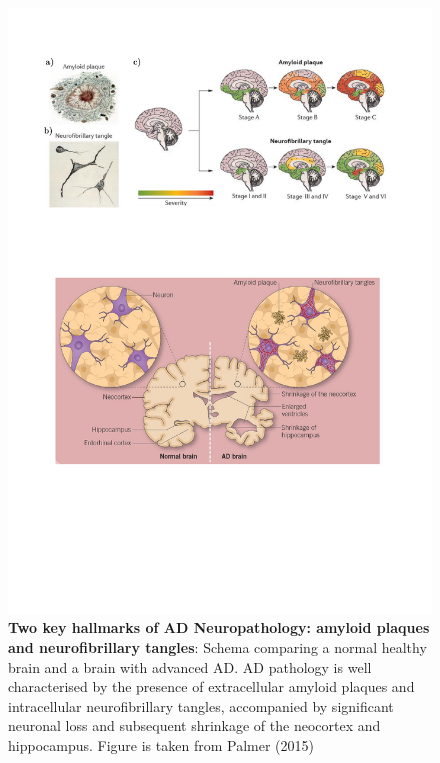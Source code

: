 \begin{figure}[!htp]
	\centering
	\includegraphics[page=1,trim={0 7cm 1cm 12cm},clip, scale = 0.8]{Figures/Introduction_Figures.pdf}
	\captionsetup{width=0.95\textwidth,singlelinecheck=off}
	\caption[Two key hallmarks of AD Neuropathology: amyloid plaques and neurofibrillary tangles]%
	{\textbf{Two key hallmarks of AD Neuropathology: amyloid plaques and neurofibrillary tangles}: Schema comparing a normal healthy brain and a brain with advanced AD. AD pathology is well characterised by the presence of extracellular amyloid plaques and intracellular neurofibrillary tangles, accompanied by significant neuronal loss and subsequent shrinkage of the neocortex and hippocampus. Figure is taken from Palmer (2015)\cite{AlanM.Palmer2015}
	}
	\label{fig:AD_intro}
\end{figure} 

